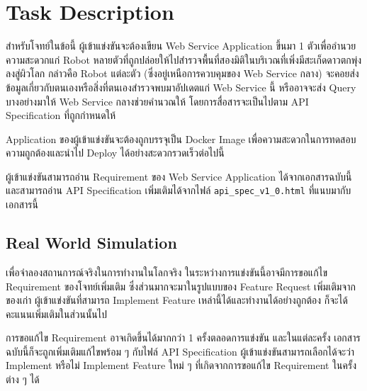 

\section{Task Description}

สำหรับโจทย์ในข้อนี้ ผู้เข้าแข่งขันจะต้องเขียน Web Service Application ขึ้นมา 1 ตัวเพื่ออำนวยความสะดวกแก่ Robot หลายตัวที่ถูกปล่อยให้ไปสำรวจพื้นที่สองมิติในบริเวณที่เพิ่งมีสะเก็ดดาวตกพุ่งลงสู่ผิวโลก \;
กล่าวคือ Robot แต่ละตัว (ซึ่งอยู่เหนือการควบคุมของ Web Service กลาง) จะคอยส่งข้อมูลเกี่ยวกับตนเองหรือสิ่งที่ตนเองสำรวจพบมาอัปเดตแก่ Web Service นี้ หรืออาจจะส่ง Query บางอย่างมาให้ Web Service กลางช่วยคำนวณให้ โดยการสื่อสารจะเป็นไปตาม API Specification ที่ถูกกำหนดให้ \;

Application ของผู้เข้าแข่งขันจะต้องถูกบรรจุเป็น Docker Image เพื่อความสะดวกในการทดสอบความถูกต้องและนำไป Deploy ได้อย่างสะดวกรวดเร็วต่อไปนี้

ผู้เข้าแข่งขันสามารถอ่าน Requirement ของ Web Service Application ได้จากเอกสารฉบับนี้ และสามารถอ่าน API Specification เพิ่มเติมได้จากไฟล์ \verb'api_spec_v1_0.html' ที่แนบมากับเอกสารนี้


\subsection{Real World Simulation}

เพื่อจำลองสถานการณ์จริงในการทำงานในโลกจริง ในระหว่างการแข่งขันนี้อาจมีการขอแก้ไข Requirement ของโจทย์เพิ่มเติม ซึ่งส่วนมากจะมาในรูปแบบของ Feature Request เพิ่มเติมจากของเก่า \;
ผู้เข้าแข่งขันที่สามารถ Implement Feature เหล่านี้ได้และทำงานได้อย่างถูกต้อง ก็จะได้คะแนนเพิ่มเติมในส่วนนั้นไป

การขอแก้ไข Requirement อาจเกิดขึ้นได้มากกว่า 1 ครั้งตลอดการแข่งขัน และในแต่ละครั้ง เอกสารฉบับนี้ก็จะถูกเพิ่มเติมแก้ไขพร้อม ๆ กับไฟล์ API Specification \;
ผู้เข้าแข่งขันสามารถเลือกได้จะว่า Implement หรือไม่ Implement Feature ใหม่ ๆ ที่เกิดจากการขอแก้ไข Requirement ในครั้งต่าง ๆ ได้

